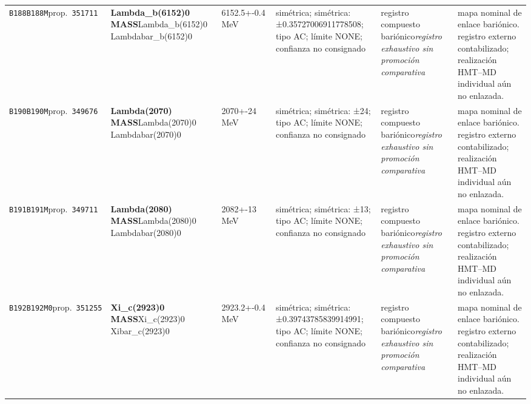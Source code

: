 \begin{landscape}
\begin{longtable}{L{1.85cm}L{4.45cm}L{2.35cm}L{4.05cm}L{3.35cm}L{7.15cm}}
\texttt{B188}\newline \texttt{B188M}\newline prop.\ \texttt{351711} & \textbf{Lambda\_\allowbreak{}b(6152)0 MASS}\newline Lambda\_\allowbreak{}b(6152)0 \textbar{}\allowbreak{} Lambdabar\_\allowbreak{}b(6152)0 & 6152.5+-0.4\,MeV & simétrica; simétrica: ±0.35727006911778508; tipo AC; límite NONE; confianza no consignado & registro compuesto bariónico\newline \emph{registro exhaustivo sin promoción comparativa} & mapa nominal de enlace bariónico. registro externo contabilizado; realización HMT--MD individual aún no enlazada. \\
\texttt{B190}\newline \texttt{B190M}\newline prop.\ \texttt{349676} & \textbf{Lambda(2070) MASS}\newline Lambda(2070)0 \textbar{}\allowbreak{} Lambdabar(2070)0 & 2070+-24\,MeV & simétrica; simétrica: ±24; tipo AC; límite NONE; confianza no consignado & registro compuesto bariónico\newline \emph{registro exhaustivo sin promoción comparativa} & mapa nominal de enlace bariónico. registro externo contabilizado; realización HMT--MD individual aún no enlazada. \\
\texttt{B191}\newline \texttt{B191M}\newline prop.\ \texttt{349711} & \textbf{Lambda(2080) MASS}\newline Lambda(2080)0 \textbar{}\allowbreak{} Lambdabar(2080)0 & 2082+-13\,MeV & simétrica; simétrica: ±13; tipo AC; límite NONE; confianza no consignado & registro compuesto bariónico\newline \emph{registro exhaustivo sin promoción comparativa} & mapa nominal de enlace bariónico. registro externo contabilizado; realización HMT--MD individual aún no enlazada. \\
\texttt{B192}\newline \texttt{B192M0}\newline prop.\ \texttt{351255} & \textbf{Xi\_\allowbreak{}c(2923)0 MASS}\newline Xi\_\allowbreak{}c(2923)0 \textbar{}\allowbreak{} Xibar\_\allowbreak{}c(2923)0 & 2923.2+-0.4\,MeV & simétrica; simétrica: ±0.39743785839914991; tipo AC; límite NONE; confianza no consignado & registro compuesto bariónico\newline \emph{registro exhaustivo sin promoción comparativa} & mapa nominal de enlace bariónico. registro externo contabilizado; realización HMT--MD individual aún no enlazada. \\

\end{longtable}
\end{landscape}
